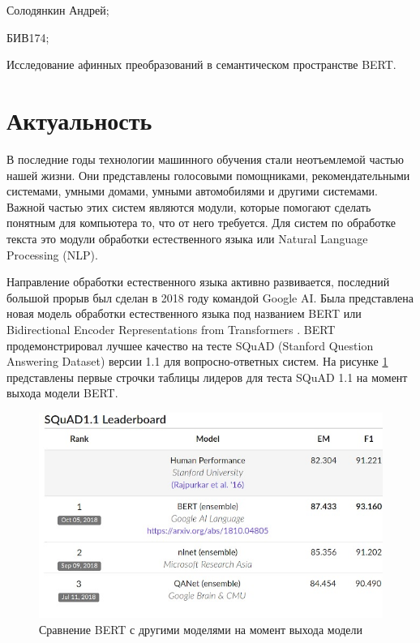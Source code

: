 \documentclass[a4paper,14pt]{article}
\begin{document}
	
	\section{}
	Солодянкин Андрей;
	
	БИВ174;
	
	Исследование афинных преобразований в семантическом пространстве BERT.
	
	\section{Актуальность}
	
	
	В последние годы технологии машинного обучения стали неотъемлемой частью нашей жизни.
	Они представлены голосовыми помощниками, рекомендательными системами, умными домами, умными автомобилями и другими системами.
	Важной частью этих систем являются модули, которые помогают сделать понятным для компьютера то, что от него требуется.
	Для систем по обработке текста это модули обработки естественного языка или Natural Language Processing (NLP).
	
	Направление обработки естественного языка активно развивается, последний большой прорыв был сделан в 2018 году командой Google AI. 
	Была представлена новая модель обработки естественного языка под названием BERT или Bidirectional Encoder Representations from Transformers \cite{bert}. 
	BERT продемонстрировал лучшее качество на тесте SQuAD (Stanford Question Answering Dataset) \cite{SQuAD} версии 1.1 для вопросно-ответных систем. На рисунке \ref{fig:quality_bert} представлены первые строчки таблицы лидеров для теста SQuAD 1.1 на момент выхода модели BERT.
	
	\begin{figure}[H]
		\centering
		\includegraphics[width=0.6\linewidth]{images/2018-11-03.-bert-nlp-method_2}
		\caption{Сравнение BERT с другими моделями на момент выхода модели}
		\label{fig:quality_bert}
	\end{figure}
	
\end{document}
